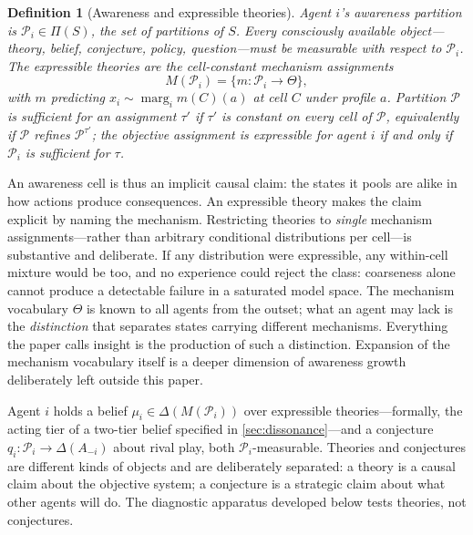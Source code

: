 \documentclass[11pt]{article}
\newtheorem{definition}[assumption]{Definition}
\theoremstyle{definition}
\newcommand{\marg}[1]{\operatorname{marg}_{#1}}
\begin{document}
\begin{definition}[Awareness and expressible theories]
\label{def:awareness}
Agent $i$'s awareness partition is $\mathcal P_i\in\Pi(S)$, the set of partitions of $S$.
Every consciously available object---theory, belief, conjecture, policy, question---must be measurable with respect to $\mathcal P_i$.
The \emph{expressible theories} are the cell-constant mechanism assignments
\begin{equation}
M(\mathcal P_i)=\{m:\mathcal P_i\to\Theta\},
\label{eq:expressible}
\end{equation}
with $m$ predicting $x_i\sim\marg{i}m(C)(a)$ at cell $C$ under profile $a$.
Partition $\mathcal P$ is \emph{sufficient} for an assignment $\tau'$ if $\tau'$ is constant on every cell of $\mathcal P$, equivalently if $\mathcal P$ refines $\mathcal P^{\tau'}$; the objective assignment is expressible for agent $i$ if and only if $\mathcal P_i$ is sufficient for $\tau$.
\end{definition}

An awareness cell is thus an implicit causal claim: the states it pools are alike in how actions produce consequences.
An expressible theory makes the claim explicit by naming the mechanism.
Restricting theories to \emph{single} mechanism assignments---rather than arbitrary conditional distributions per cell---is substantive and deliberate.
If any distribution were expressible, any within-cell mixture would be too, and no experience could reject the class: coarseness alone cannot produce a detectable failure in a saturated model space.
The mechanism vocabulary $\Theta$ is known to all agents from the outset; what an agent may lack is the \emph{distinction} that separates states carrying different mechanisms.
Everything the paper calls insight is the production of such a distinction.
Expansion of the mechanism vocabulary itself is a deeper dimension of awareness growth deliberately left outside this paper.

Agent $i$ holds a belief $\mu_i\in\Delta(M(\mathcal P_i))$ over expressible theories---formally, the acting tier of a two-tier belief specified in \cref{sec:dissonance}---and a conjecture $q_i:\mathcal P_i\to\Delta(A_{-i})$ about rival play, both $\mathcal P_i$-measurable.
Theories and conjectures are different kinds of objects and are deliberately separated: a theory is a causal claim about the objective system; a conjecture is a strategic claim about what other agents will do.
The diagnostic apparatus developed below tests theories, not conjectures.
\end{document}

